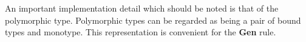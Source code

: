 \documentclass[11pt,oneside,a4paper]{report}
\begin{document}
An important implementation detail which should be noted is that of the polymorphic type.
Polymorphic types can be regarded as being a pair of bound types and monotype.
This representation is convenient for the \textbf{Gen} rule.
\end{document}
